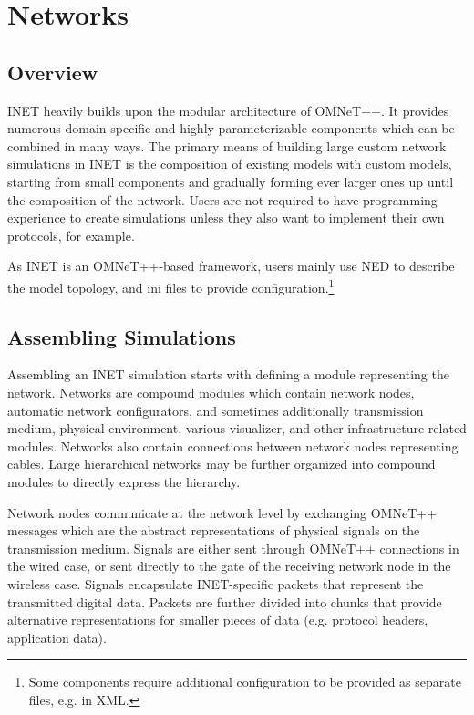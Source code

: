 \chapter{Networks}
\label{cha:networks}

\section{Overview}


INET heavily builds upon the modular architecture of OMNeT++. It provides 
numerous domain specific and highly parameterizable components which can be
combined in many ways. The primary means of building large custom network 
simulations in INET is the composition of existing models with custom models,
starting from small components and gradually forming ever larger ones up until
the composition of the network. Users are not required to have programming 
experience to create simulations unless they also want to implement 
their own protocols, for example.

As INET is an OMNeT++-based framework, users mainly use NED to describe the
model topology, and ini files to provide configuration.\footnote{Some 
components require additional configuration to be provided as separate
files, e.g. in XML.} 

\section{Assembling Simulations}

Assembling an INET simulation starts with defining a module representing
the network. Networks are compound modules which contain network nodes,
automatic network configurators, and sometimes additionally transmission
medium, physical environment, various visualizer, and other infrastructure
related modules. Networks also contain connections between network nodes
representing cables. Large hierarchical networks may be further organized
into compound modules to directly express the hierarchy.

Network nodes communicate at the network level by exchanging OMNeT++ messages 
which are the abstract representations of physical signals on the 
transmission medium.  Signals are either sent through OMNeT++ connections 
in the wired case, or sent directly to the gate of the receiving network node 
in the wireless case. Signals encapsulate INET-specific packets that represent 
the transmitted digital data. Packets are further divided into chunks that
provide alternative representations for smaller pieces of data (e.g. 
protocol headers, application data).

